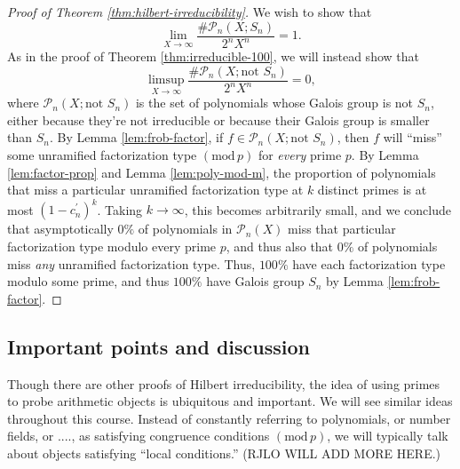 \documentclass[12pt]{amsart}
\theoremstyle{definition} \newtheorem*{notation}{Notation}
\theoremstyle{remark} \newtheorem*{remark}{Remark}
\theoremstyle{remark} \newtheorem*{example}{Example}
\theoremstyle{definition} \newtheorem*{definition}{Definition}
\numberwithin{equation}{section}
\numberwithin{theorem}{section}
\renewcommand{\pmod}[1]{\left(\mathrm{mod}\,#1\right)}
\begin{document}
	\begin{proof}[Proof of Theorem \ref{thm:hilbert-irreducibility}]
		We wish to show that
			\[
				\lim_{X \to \infty} \frac{ \#\mathcal{P}_n(X;S_n)}{2^n X^n} = 1.
			\]
		As in the proof of Theorem \ref{thm:irreducible-100}, we will instead show that
			\[
				\limsup_{X \to \infty} \frac{ \#\mathcal{P}_n(X;\text{not } S_n)}{2^n X^n} = 0,
			\]
		where $\mathcal{P}_n(X;\text{not } S_n)$ is the set of polynomials whose Galois group is not $S_n$, either because they're not irreducible or because their Galois group is smaller than $S_n$.  By Lemma \ref{lem:frob-factor}, if $f \in \mathcal{P}_n(X;\text{not } S_n)$, then $f$ will ``miss'' some unramified factorization type $\pmod{p}$ for \emph{every} prime $p$.  By Lemma \ref{lem:factor-prop} and Lemma \ref{lem:poly-mod-m}, the proportion of polynomials that miss a particular unramified factorization type at $k$ distinct primes is at most $(1-c_n^\prime)^k$.  Taking $k \to \infty$, this becomes arbitrarily small, and we conclude that asymptotically $0\%$ of polynomials in $\mathcal{P}_n(X)$ miss that particular factorization type modulo every prime $p$, and thus also that $0\%$ of polynomials miss \emph{any} unramified factorization type.  Thus, $100\%$ have each factorization type modulo some prime, and thus $100\%$ have Galois group $S_n$ by Lemma \ref{lem:frob-factor}.
	\end{proof}
	
	\subsection{Important points and discussion}
	
	Though there are other proofs of Hilbert irreducibility, the idea of using primes to probe arithmetic objects is ubiquitous and important.  We will see similar ideas throughout this course.  Instead of constantly referring to polynomials, or number fields, or ...., as satisfying congruence conditions $\pmod{p}$, we will typically talk about objects satisfying ``local conditions.''  (RJLO WILL ADD MORE HERE.)
	
\end{document}
